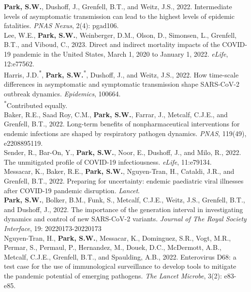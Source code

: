 \documentclass[11pt]{article} %
\begin{document}
 \textbf{Park, S.W.}, Dushoff, J., Grenfell, B.T., and Weitz, J.S., 2022. Intermediate levels of asymptomatic transmission can lead to the highest levels of epidemic fatalities. \textit{PNAS Nexus}, 2(4): pgad106.\\

 Lee, W.E., \textbf{Park, S.W.}, Weinberger, D.M., Olson, D., Simonsen, L., Grenfell, B.T., and Viboud, C., 2023. Direct and indirect mortality impacts of the COVID-19 pandemic in the United States, March 1, 2020 to January 1, 2022. \textit{eLife}, 12:e77562.\\

 Harris, J.D.\textsuperscript{*}, \textbf{Park, S.W.}\textsuperscript{*}, Dushoff, J., and Weitz, J.S., 2022. How time-scale differences in asymptomatic and symptomatic transmission shape SARS-CoV-2 outbreak dynamics. \textit{Epidemics}, 100664.\\
\textsuperscript{*}Contributed equally.\\

 Baker, R.E., Saad Roy, C.M., \textbf{Park, S.W.}, Farrar, J., Metcalf, C.J.E., and Grenfell, B.T., 2022. Long-term benefits of nonpharmaceutical interventions for endemic infections are shaped by respiratory pathogen dynamics. \textit{PNAS}, 119(49), e2208895119.\\

 Sender, R., Bar-On, Y., \textbf{Park, S.W.}, Noor, E., Dushoff, J., and Milo, R., 2022. The unmitigated profile of COVID-19 infectiousness. \textit{eLife}, 11:e79134.\\

 Messacar, K., Baker, R.E., \textbf{Park, S.W.}, Nguyen-Tran, H., Cataldi, J.R., and Grenfell, B.T., 2022. Preparing for uncertainty: endemic paediatric viral illnesses after COVID-19 pandemic disruption. \textit{Lancet}.\\

 \textbf{Park, S.W.}, Bolker, B.M., Funk, S., Metcalf, C.J.E., Weitz, J.S., Grenfell, B.T., and Dushoff, J., 2022. The importance of the generation interval in investigating dynamics and control of new SARS-CoV-2 variants. \textit{Journal of The Royal Society Interface}, 19: 20220173-20220173\\

 Nguyen-Tran, H., \textbf{Park, S.W.}, Messacar, K., Dominguez, S.R., Vogt, M.R., Permar, S., Permaul, P., Hernandez, M., Douek, D.C., McDermott, A.B., Metcalf, C.J.E., Grenfell, B.T., and Spaulding, A.B., 2022. Enterovirus D68: a test case for the use of immunological surveillance to develop tools to mitigate the pandemic potential of emerging pathogens. \textit{The Lancet Microbe}, 3(2): e83-e85.\\
\end{document}
